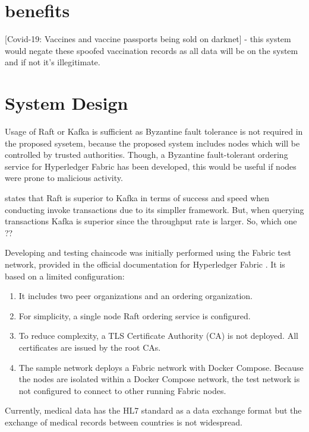 \section{benefits}
[Covid-19: Vaccines and vaccine passports being sold on darknet] - this system would negate these spoofed vaccination records as all data will be on the system and if not it's illegitimate.
\linebreak[3]

\section{System Design}

Usage of Raft or Kafka is sufficient as Byzantine fault tolerance is not required in the proposed sysetem, because the proposed system includes nodes which will be controlled by trusted authorities. 
Though, a Byzantine fault-tolerant ordering service for Hyperledger Fabric has been developed, this would be useful if nodes were prone to malicious activity. \cite{sousa_byzantine_2018}

\cite{yusuf1_comparison_2020} states that Raft is superior to Kafka in terms of success and speed when conducting invoke transactions due to its simpller framework. But, when querying transactions Kafka is superior since the throughput rate is larger.
So, which one ??

Developing and testing chaincode was initially performed using the Fabric test network, provided in the official documentation for Hyperledger Fabric \cite{noauthor_using_nodate}. 
It is based on a limited configuration:
\begin{enumerate}
\item{It includes two peer organizations and an ordering organization.}
\item{For simplicity, a single node Raft ordering service is configured.}
\item{To reduce complexity, a TLS Certificate Authority (CA) is not deployed. All certificates are issued by the root CAs.}
\item{The sample network deploys a Fabric network with Docker Compose. Because the nodes are isolated within a Docker Compose network, the test network is not configured to connect to other running Fabric nodes.} \cite{noauthor_using_nodate}
\end{enumerate}


Currently, medical data has the HL7 standard as a data exchange format but the
exchange of medical records between countries is not widespread. \cite{kung_personal_2020}

